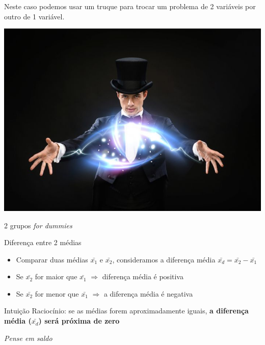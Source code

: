 \documentclass{beamer}
\begin{document}
\begin{frame}{}
  \begin{block}{}
    \large
    Neste caso podemos usar um truque para \alert{trocar} um problema de 2 variáveis por outro de 1 variável.
  \end{block}
  \bigskip
  \bigskip
  \begin{center}
    \includegraphics[width=.6\textwidth]{Cap7/magic}
  \end{center}
\end{frame}

\begin{frame}{2 grupos {\em for dummies} \textregistered}
  \begin{block}{Diferença entre 2 médias}
    \small
    \begin{itemize}
    \item Comparar duas médias $\bar{x_1}$ e $\bar{x_2}$, consideramos a diferença média $\bar{x_d} = \bar{x_2} - \bar{x_1}$
    \item Se $\bar{x_2}$ for maior que $\bar{x_1}$  $\Rightarrow$ diferença média é positiva
    \item Se $\bar{x_2}$ for menor que $\bar{x_1}$  $\Rightarrow$ a diferença média é negativa
    \end{itemize}
  \end{block}
  \begin{block}{Intuição}
    Raciocínio: se as médias forem aproximadamente iguais, {\bf a
    diferença média ($\bar{x_d}$) será próxima de zero}
  \end{block}
  \begin{center}
    {\em Pense em \alert{saldo}}
  \end{center}
\end{frame}
\end{document}
